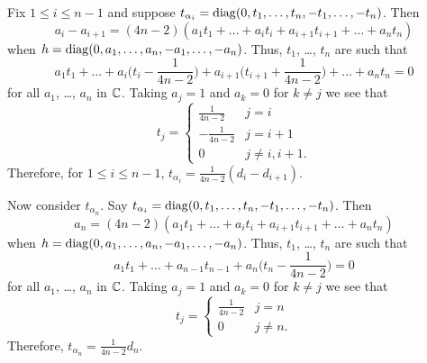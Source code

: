 Fix $1\leq i\leq n-1$ and suppose $t_{\alpha_i}= {\operatorname{diag}(0,t_1,\dots,t_n,
  -t_1,\dots,-t_n)}$. Then
\begin{equation*}
  a_i-a_{i+1}= (4n-2)(a_1t_1+\dots+a_it_i+a_{i+1}t_{i+1}+ \dots +a_nt_n)
\end{equation*}
when $h={\operatorname{diag}(0,a_1,\dots,a_n, -a_1,\dots,-a_n)}$. Thus, $t_1$, \dots, $t_n$ are such that
\begin{equation*}
  \textstyle a_1t_1+\dots+a_i\big(t_i- \frac 1{4n-2} \big) +a_{i+1}
  \big(t_{i+1} +\frac 1{4n-2} \big)+  \dots +a_nt_n=0 
\end{equation*}
for all $a_1$, \dots, $a_n$ in ${\mathbb C}$. Taking $a_j=1$ and $a_k=0$ for $k\ne
j$ we see that
\[
t_j= \begin{cases} \textstyle \frac 1{4n-2}&j=i \\ -\frac 1{4n-2} &j=i+1 \\0
  &j\ne i, i+1. \end{cases}
\]
Therefore, for $1\leq i\leq n-1$, $t_{\alpha_i}=\frac 1{4n-2}( d_i-
d_{i+1})$.

Now consider $t_{\alpha_n}$. Say $t_{\alpha_i}= {\operatorname{diag}(0,t_1,\dots,t_n,
  -t_1,\dots,-t_n)}$. Then
\begin{equation*}
  a_n= (4n-2)(a_1t_1+\dots+a_it_i+a_{i+1}t_{i+1}+ \dots +a_nt_n)
\end{equation*}
when $h={\operatorname{diag}(0,a_1,\dots,a_n, -a_1,\dots,-a_n)}$. Thus, $t_1$, \dots, $t_n$ are such that
\begin{equation*}
  \textstyle  a_1t_1+\dots+a_{n-1} t_{n-1} +a_n\big(t_n-\frac 1{4n-2}\big)=0 
\end{equation*}
for all $a_1$, \dots, $a_n$ in ${\mathbb C}$. Taking $a_j=1$ and $a_k=0$ for $k\ne
j$ we see that
\[
t_j= \begin{cases} \textstyle \frac 1{4n-2}&j=n \\ 0 &j\ne n. \end{cases}
\]
Therefore, $t_{\alpha_n}=\frac 1{4n-2} d_n$.


